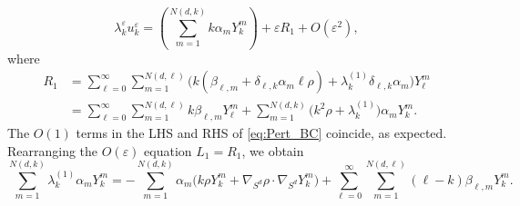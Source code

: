 \documentclass[11pt]{amsart}
\theoremstyle{definition}
\theoremstyle{plain}
\theoremstyle{remark}
\newcommand{\vareps}{\varepsilon}
\begin{document}
\begin{equation*} 
\lambda_k^\vareps u_k^\vareps = \left(\sum_{m = 1}^{N(d, k)} k\alpha_m Y_k^m\right) + \vareps R_1 + O(\vareps^2),
\end{equation*} 
where 
\begin{align*} 
R_1 & = \sum_{\ell = 0}^\infty\sum_{m = 1}^{N(d, \ell)} \Big(k\left(\beta_{\ell, m} + \delta_{\ell, k}\alpha_m\ell\rho\right) + \lambda_k^{(1)}\delta_{\ell, k}\alpha_m\Big)Y_\ell^m \\ 
& = \sum_{\ell = 0}^\infty\sum_{m = 1}^{N(d, \ell)} k\beta_{\ell, m}Y_\ell^m + \sum_{m = 1}^{N(d, k)} \Big(k^2\rho + \lambda_k^{(1)}\Big)\alpha_m Y_k^m. 
\end{align*} 
The $O(1)$ terms in the LHS and RHS of \eqref{eq:Pert_BC} coincide, as expected. Rearranging the $O(\vareps)$ equation $L_1 = R_1$, we obtain 
\begin{equation} \label{eq:Pert_Oeps}  
\sum_{m = 1}^{N(d, k)} \lambda_k^{(1)}\alpha_mY_k^m = -\sum_{m = 1}^{N(d, k)} \alpha_m\Big(k\rho Y_k^m + \nabla_{S^d}\rho\cdot \nabla_{S^d}Y_k^m\Big) + \sum_{\ell = 0}^\infty\sum_{m = 1}^{N(d, \ell)} (\ell - k)\beta_{\ell, m}Y_k^m.  
\end{equation} 
\end{document}
